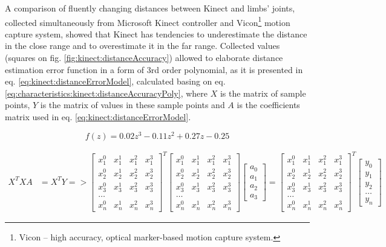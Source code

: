 \documentclass[sensors,article,submit,moreauthors,pdftex,10pt,a4paper]{mdpi}
\begin{document}
A comparison of fluently changing distances between Kinect and limbs' joints, collected simultaneously from Microsoft Kinect controller and Vicon\footnote{Vicon -- high accuracy, optical marker-based motion capture system.} motion capture system, showed that Kinect has tendencies to underestimate the distance in the close range and to overestimate it in the far range. Collected values (squares on fig. \ref{fig:kinect:distanceAccuracy}) allowed to elaborate distance estimation error function in a form of 3rd order polynomial, as it is presented in eq. \ref{eq:kinect:distanceErrorModel}, calculated basing on eq. \ref{eq:characteristics:kinect:distanceAccuracyPoly}, where $X$ is the matrix of sample points, $Y$ is the matrix of values in these sample points and $A$ is the coefficients matrix used in eq. \ref{eq:kinect:distanceErrorModel}. 

\begin{equation}
	f(z)=0.02z^3-0.11z^2+0.27z-0.25 
	\label{eq:kinect:distanceErrorModel}
\end{equation}

\begin{equation}
\begin{split}
		X^TXA &= X^TY => \begin{bmatrix}
		x_1^0&x_1^1&x_1^2&x_1^3\\
		x_2^0&x_2^1&x_2^2&x_2^3\\
		x_3^0&x_3^1&x_3^2&x_3^3\\
		\dots\\
		x_n^0&x_n^1&x_n^2&x_n^3
		\end{bmatrix}^T
		\begin{bmatrix}
			x_1^0 & x_1^1 & x_1^2 & x_1^3 \\
			x_2^0 & x_2^1 & x_2^2 & x_2^3 \\
			x_3^0 & x_3^1 & x_3^2 & x_3^3 \\
			\dots\\
			x_n^0 & x_n^1 & x_n^2 & x_n^3 
		\end{bmatrix}
		\begin{bmatrix}
			a_0 \\a_1\\a_2\\a_3
		\end{bmatrix}
		=
		\begin{bmatrix}
			x_1^0 & x_1^1 & x_1^2 & x_1^3 \\
			x_2^0 & x_2^1 & x_2^2 & x_2^3 \\
			x_3^0 & x_3^1 & x_3^2 & x_3^3 \\
			\dots\\
			x_n^0 & x_n^1 & x_n^2 & x_n^3 
		\end{bmatrix}^T
		\begin{bmatrix}
			y_0 \\y_1\\y_2\\\dots\\y_n
		\end{bmatrix} 
	\end{split}
\label{eq:characteristics:kinect:distanceAccuracyPoly}
\end{equation}
\end{document}
